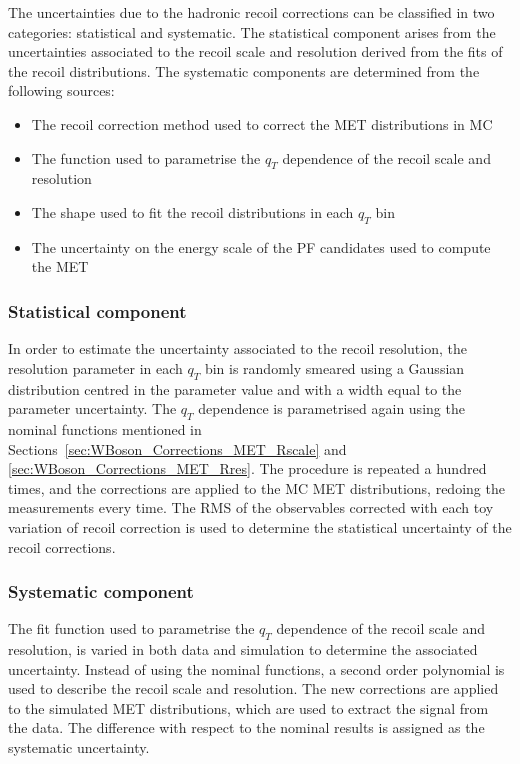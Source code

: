 The uncertainties due to the hadronic recoil corrections can be classified in two categories: statistical and systematic. The statistical component arises from the uncertainties associated to the recoil scale and resolution derived from the fits of the recoil distributions. The systematic components are determined from the following sources:
\begin{itemize}
\item The recoil correction method used to correct the MET distributions in MC
\item The function used to parametrise the $q_{T}$ dependence of the recoil scale and resolution
\item The shape used to fit the recoil distributions in each $q_{T}$ bin
\item The uncertainty on the energy scale of the PF candidates used to compute the MET
\end{itemize}

\subsubsection{Statistical component}

In order to estimate the uncertainty associated to the recoil resolution, the resolution parameter in each $q_{T}$ bin is randomly smeared using a Gaussian distribution centred in the parameter value and with a width equal to the parameter uncertainty. The $q_{T}$ dependence is parametrised again using the nominal functions mentioned in Sections~\ref{sec:WBoson_Corrections_MET_Rscale} and \ref{sec:WBoson_Corrections_MET_Rres}. The procedure is repeated a hundred times, and the corrections are applied to the MC MET distributions, redoing the measurements every time. The RMS of the observables corrected with each toy variation of recoil correction is used to determine the statistical uncertainty of the recoil corrections.

\subsubsection{Systematic component}

The fit function used to parametrise the $q_{T}$ dependence of the recoil scale and resolution, is varied in both data and simulation to determine the associated uncertainty. Instead of using the nominal functions, a second order polynomial is used to describe the recoil scale and resolution. The new corrections are applied to the simulated MET distributions, which are used to extract the signal from the data. The difference with respect to the nominal results is assigned as the systematic uncertainty.

